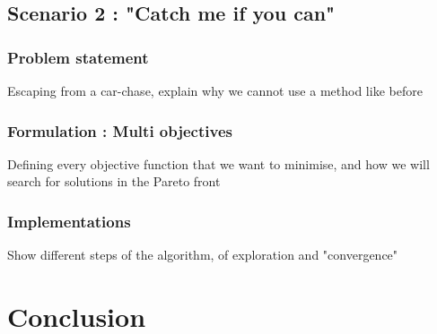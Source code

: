 \documentclass{article}
\begin{document}
	\subsection{Scenario 2 : "Catch me if you can"}
		\subsubsection{Problem statement}
			Escaping from a car-chase, explain why we cannot use a method like before
		\subsubsection{Formulation : Multi objectives}
			Defining every objective function that we want to minimise, and how we will search for solutions in the Pareto front
		\subsubsection{Implementations}
			Show different steps of the algorithm, of exploration and "convergence"
\section*{Conclusion}
			
\end{document}
